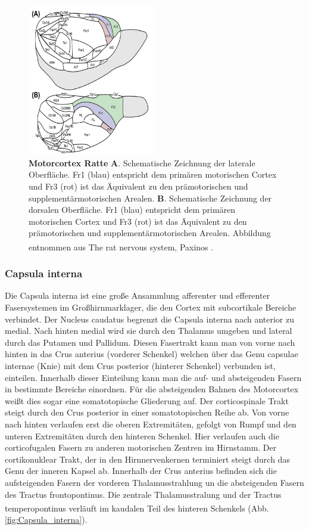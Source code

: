 \documentclass[12pt,a4paper,pdftex]{article}
\begin{document}
\begin{figure}[H]
    \centering
    \includegraphics[width=0.5\textwidth]{pictures/Bilder_Laura/rat_motorcortex_1.png}
    \caption[Motorcortex Ratte]{\textbf{Motorcortex Ratte} \textbf{A}. Schematische Zeichnung der laterale Oberfläche. Fr1 (blau) entspricht dem primären motorischen Cortex und Fr3 (rot) ist das Äquivalent zu den prämotorischen und supplementärmotorischen Arealen. \textbf{B}. Schematische Zeichnung der dorsalen Oberfläche. Fr1 (blau) entspricht dem primären motorischen Cortex und Fr3 (rot) ist das Äquivalent zu den prämotorischen und supplementärmotorischen Arealen. Abbildung entnommen aus The rat nervous system, Paxinos \textsuperscript{\cite[22]{paxinos2014rat}}.}
    \label{fig:motorcortex_ratte}
\end{figure}


\subsubsection*{Capsula interna} 
Die Capsula interna ist eine große Ansammlung afferenter und efferenter Fasersystemen im Großhirnmarklager, die den Cortex mit subcortikale Bereiche verbindet. Der Nucleus caudatus begrenzt die Capsula interna nach anterior zu medial. Nach hinten medial wird sie durch den Thalamus umgeben und lateral durch das Putamen und Pallidum. Diesen Fasertrakt kann man von vorne nach hinten in das Crus anterius (vorderer Schenkel) welchen über das Genu capsulae internae (Knie) mit dem Crus posterior (hinterer Schenkel) verbunden ist, einteilen. Innerhalb dieser Einteilung kann man die auf- und absteigenden Fasern in bestimmte Bereiche einordnen. Für die absteigenden Bahnen des Motorcortex weißt dies sogar eine somatotopische Gliederung auf. Der corticospinale Trakt steigt durch den Crus posterior in einer somatotopischen Reihe ab. Von vorne nach hinten verlaufen erst die oberen Extremitäten, gefolgt von Rumpf und den unteren Extremitäten durch den hinteren Schenkel. Hier verlaufen auch die corticofugalen Fasern zu anderen motorischen Zentren im Hirnstamm. Der cortikonuklear Trakt, der in den Hirnnervenkernen terminiert steigt durch das Genu der inneren Kapsel ab. Innerhalb der Crus anterius befinden sich die aufsteigenden Fasern der vorderen Thalamusstrahlung un die absteigenden Fasern des Tractus frontopontinus. Die zentrale Thalamusstralung und der Tractus temperopontinus verläuft im kaudalen Teil des hinteren Schenkels \textsuperscript{\cite[9]{trepel2011neuroanatomie}} (Abb. \ref{fig:Capsula_interna}).
\end{document}
